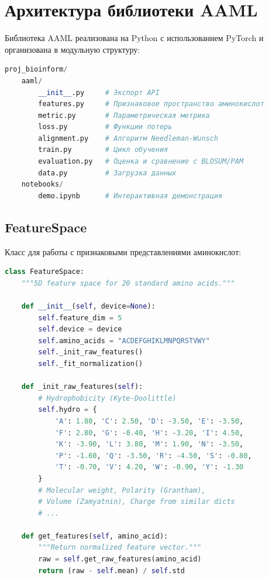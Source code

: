 \documentclass[12pt]{article}
\begin{document}
\section{Архитектура библиотеки AAML}

Библиотека AAML реализована на Python с использованием PyTorch и организована в модульную структуру:

\begin{lstlisting}[language=Python]
proj_bioinform/
    aaml/
        __init__.py     # Экспорт API
        features.py     # Признаковое пространство аминокислот
        metric.py       # Параметрическая метрика
        loss.py         # Функции потерь
        alignment.py    # Алгоритм Needleman-Wunsch
        train.py        # Цикл обучения
        evaluation.py   # Оценка и сравнение с BLOSUM/PAM
        data.py         # Загрузка данных
    notebooks/
        demo.ipynb      # Интерактивная демонстрация
\end{lstlisting}

\subsection{FeatureSpace}

Класс для работы с признаковыми представлениями аминокислот:

\begin{lstlisting}[language=Python]
class FeatureSpace:
    """5D feature space for 20 standard amino acids."""
    
    def __init__(self, device=None):
        self.feature_dim = 5
        self.device = device
        self.amino_acids = "ACDEFGHIKLMNPQRSTVWY"
        self._init_raw_features()
        self._fit_normalization()
    
    def _init_raw_features(self):
        # Hydrophobicity (Kyte-Doolittle)
        self.hydro = {
            'A': 1.80, 'C': 2.50, 'D': -3.50, 'E': -3.50,
            'F': 2.80, 'G': -0.40, 'H': -3.20, 'I': 4.50,
            'K': -3.90, 'L': 3.80, 'M': 1.90, 'N': -3.50,
            'P': -1.60, 'Q': -3.50, 'R': -4.50, 'S': -0.80,
            'T': -0.70, 'V': 4.20, 'W': -0.90, 'Y': -1.30
        }
        # Molecular weight, Polarity (Grantham),
        # Volume (Zamyatnin), Charge from similar dicts
        # ...
    
    def get_features(self, amino_acid):
        """Return normalized feature vector."""
        raw = self.get_raw_features(amino_acid)
        return (raw - self.mean) / self.std
\end{lstlisting}
\end{document}
